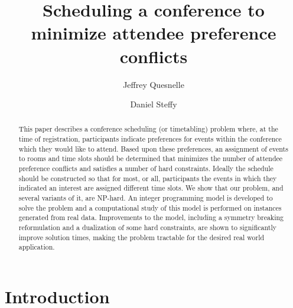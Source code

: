 \documentclass{svjour3}                     %
\begin{document}
	
\title{Scheduling a conference to minimize attendee preference conflicts}
\author{Jeffrey Quesnelle \and Daniel Steffy}
	

\maketitle
	
\begin{abstract}
This paper describes a conference scheduling (or timetabling) problem where, at the time of registration, participants indicate preferences for events within the conference which they would like to attend.
Based upon these preferences, an assignment of events to rooms and time slots should be determined that minimizes the number of attendee preference conflicts and satisfies a number of hard constraints.
Ideally the schedule should be constructed so that for most, or all, participants the events in which they indicated an interest are assigned different time slots.
We show that our problem, and several variants of it, are NP-hard.
An integer programming model is developed to solve the problem and a computational study of this model is performed on instances generated from real data.
Improvements to the model, including a symmetry breaking reformulation and a dualization of some hard constraints, are shown to significantly improve solution times, making the problem tractable for the desired real world application.
\end{abstract}

\section{Introduction}
\end{document}
